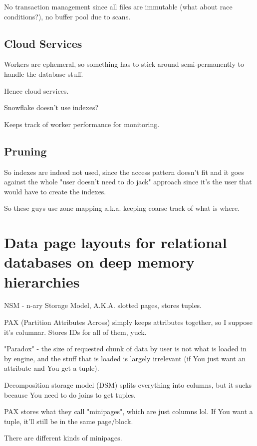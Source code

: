 \documentclass{article}
\begin{document}
		No transaction management since all files are immutable (what about race conditions?), no buffer pool due to scans.
	
	\subsection{Cloud Services}
	
		Workers are ephemeral, so something has to stick around semi-permanently to handle the database stuff.
		
		Hence cloud services.
		
		Snowflake doesn't use indexes? 
		
		Keeps track of worker performance for monitoring.
		
	\subsection{Pruning}
	
		So indexes are indeed not used, since the access pattern doesn't fit and it goes against the whole "user doesn't need to do jack" approach since it's the user that would have to create the indexes.
		
		So these guys use zone mapping a.k.a. keeping coarse track of what is where.
	
	
	
			
\newpage
\section{Data page layouts for relational databases on deep memory hierarchies}

	NSM - n-ary Storage Model, A.K.A. slotted pages, stores tuples.
	
	PAX (Partition Attributes Across) simply keeps attributes together, so I suppose it's columnar. Stores IDs for all of them, yuck.
	
	"Paradox" - the size of requested chunk of data by user is not what is loaded in by engine, and the stuff that is loaded is largely irrelevant (if You just want an attribute and You get a tuple).
	
	Decomposition storage model (DSM) splits everything into columns, but it sucks because You need to do joins to get tuples.
	
	PAX stores what they call "minipages", which are just columns lol. If You want a tuple, it'll still be in the same page/block.
	
	There are different kinds of minipages.
	
\end{document}
